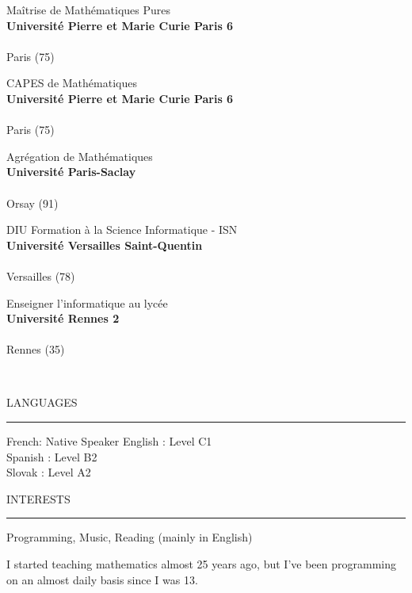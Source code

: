 \documentclass[12pt,a4paper,article,english,firamath]{nsi}
\begin{document}
\begin{multicols}{2}
\bigskip Maîtrise de Mathématiques Pures \\
{\color{UGLiBlue}\textbf{Université Pierre et Marie Curie Paris 6}}\\
{\color{lightgray}\\ \faMapMarker* Paris (75)}

\bigskip CAPES de Mathématiques \\
{\color{UGLiBlue}\textbf{Université Pierre et Marie Curie Paris 6}}\\
{\color{lightgray}\\ \faMapMarker* Paris (75)}

\bigskip Agrégation de Mathématiques \\
{\color{UGLiBlue}\textbf{Université Paris-Saclay}}\\
{\color{lightgray}\\ \faMapMarker* Orsay (91)}

\bigskip DIU Formation à la Science Informatique - ISN \\
{\color{UGLiBlue}\textbf{Université Versailles Saint-Quentin}}\\
{\color{lightgray}\\ \faMapMarker* Versailles (78)}

\bigskip Enseigner l'informatique au lycée \\
{\color{UGLiBlue}\textbf{Université Rennes 2}}\\
{\color{lightgray}\\ \faMapMarker* Rennes (35)}

\end{multicols}
\ \\
\begin{multicols}{2}
{\color{UGLiBlue}\large\titlefont LANGUAGES\\[-1em]\hrule}
\medskip 
French: Native Speaker
English : Level C1\\
Spanish : Level B2\\
Slovak : Level A2\\

\columnbreak

{\color{UGLiBlue}\large\titlefont INTERESTS\\[-1em]\hrule}
\medskip 
Programming, Music, Reading (mainly in English)

\end{multicols}
\newpage
I started teaching mathematics almost 25 years ago, but I've been programming on an almost daily basis since I was 13.\\
\end{document}
